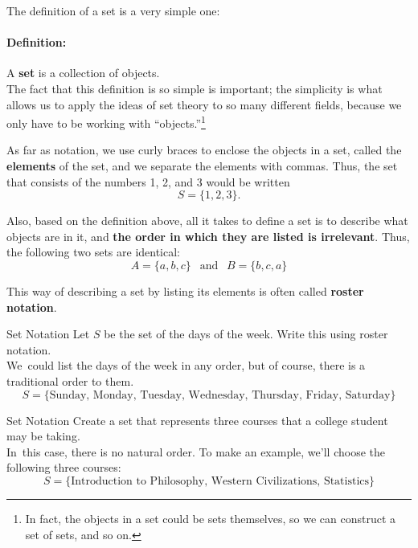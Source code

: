 \setcounter{ExampleCounter}{1}
The definition of a set is a very simple one:
\paragraph{Definition:} A \textbf{set} is a collection of objects.\\

The fact that this definition is so simple is important; the simplicity is what allows us to apply the ideas of set theory to so many different fields, because we only have to be working with ``objects.''\footnote{In fact, the objects in a set could be sets themselves, so we can construct a set of sets, and so on.}

As far as notation, we use curly braces to enclose the objects in a set, called the \textbf{elements} of the set, and we separate the elements with commas.  Thus, the set that consists of the numbers 1, 2, and 3 would be written
\[S = \{1, 2, 3\}.\]

Also, based on the definition above, all it takes to define a set is to describe what objects are in it, and \textbf{the order in which they are listed is irrelevant}.  Thus, the following two sets are identical:
\[A = \{a, b, c\} \ \ \textrm{ and } \ \ B = \{b, c, a\}\]

This way of describing a set by listing its elements is often called \textbf{roster notation}.

\begin{example}[https://www.youtube.com/watch?v=QKKv0mF1wdo]{Set Notation}
Let $S$ be the set of the days of the week.  Write this using roster notation.\\

We\sol\ could list the days of the week in any order, but of course, there is a traditional order to them.
\[S = \{\textrm{Sunday, Monday, Tuesday, Wednesday, Thursday, Friday, Saturday}\}\]
\end{example}

\begin{example}[https://www.youtube.com/watch?v=cZkOnM0HnhU]{Set Notation}
Create a set that represents three courses that a college student may be taking.\\

In\sol\ this case, there is no natural order.  To make an example, we'll choose the following three courses:
\[S = \{\textrm{Introduction to Philosophy, Western Civilizations, Statistics}\}\]
\end{example}

